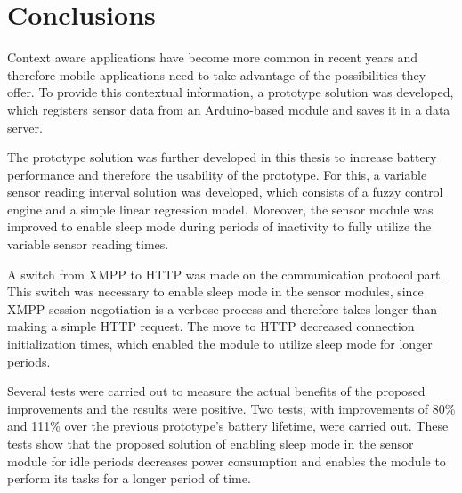 
\chapter{Conclusions} %

Context aware applications have become more common in recent years and therefore mobile applications need to take advantage of the possibilities they offer. To provide this contextual information, a prototype solution was developed, which registers sensor data from an Arduino-based module and saves it in a data server.

The prototype solution was further developed in this thesis to increase battery performance and therefore the usability of the prototype. For this, a variable sensor reading interval solution was developed, which consists of a fuzzy control engine and a simple linear regression model. Moreover, the sensor module was improved to enable sleep mode during periods of inactivity to fully utilize the variable sensor reading times.

A switch from XMPP to HTTP was made on the communication protocol part. This switch was necessary to enable sleep mode in the sensor modules, since XMPP session negotiation is a verbose process and therefore takes longer than making a simple HTTP request. The move to HTTP decreased connection initialization times, which enabled the module to utilize sleep mode for longer periods.

Several tests were carried out to measure the actual benefits of the proposed improvements and the results were positive. Two tests, with improvements of 80\% and 111\% over the previous prototype's battery lifetime, were carried out. These tests show that the proposed solution of enabling sleep mode in the sensor module for idle periods decreases power consumption and enables the module to perform its tasks for a longer period of time.
 

\ifpdf
    \graphicspath{{X/figures/PNG/}{X/figures/PDF/}{X/figures/}}
\else
    \graphicspath{{X/figures/EPS/}{X/figures/}}
\fi



